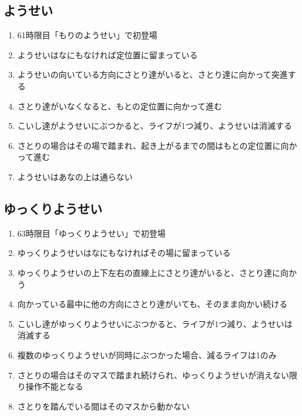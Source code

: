 \subsection{ようせい}
\begin{enumerate}[label={\sarrow}]
\item 61時限目「もりのようせい」で初登場
\item ようせいはなにもなければ定位置に留まっている
\item ようせいの向いている方向にさとり達がいると、さとり達に向かって突進する
\item さとり達がいなくなると、もとの定位置に向かって進む
\item こいし達がようせいにぶつかると、ライフが1つ減り、ようせいは消滅する
\item さとりの場合はその場で踏まれ、起き上がるまでの間はもとの定位置に向かって進む
\item ようせいはあなの上は通らない
\end{enumerate}


\subsection{ゆっくりようせい}
\begin{enumerate}[label={\sarrow}]
\item 63時限目「ゆっくりようせい」で初登場
\item ゆっくりようせいはなにもなければその場に留まっている
\item ゆっくりようせいの上下左右の直線上にさとり達がいると、さとり達に向かう
\item 向かっている最中に他の方向にさとり達がいても、そのまま向かい続ける
\item こいし達がゆっくりようせいにぶつかると、ライフが1つ減り、ようせいは消滅する
\item 複数のゆっくりようせいが同時にぶつかった場合、減るライフは1のみ
\item さとりの場合はそのマスで踏まれ続けられ、ゆっくりようせいが消えない限り操作不能となる
\item さとりを踏んでいる間はそのマスから動かない
\end{enumerate}


